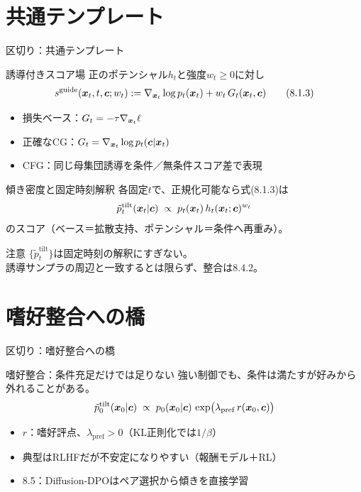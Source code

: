 \section{共通テンプレート}
\asmain
\begin{frame}{区切り：共通テンプレート}
    \tableofcontents[currentsection]
\end{frame}
\asmain
\begin{frame}{誘導付きスコア場}
    正のポテンシャル$h_t$と強度$w_t\ge 0$に対し
    \[
        s^{\mathrm{guide}}(\bm{x}_t,t,\bm{c};w_t)
        :=
        \nabla_{\bm{x}_t}\log p_t(\bm{x}_t)
        +
        w_t\,G_t(\bm{x}_t,\bm{c})
        \tag{8.1.3}
    \]
    \begin{itemize}
        \item 損失ベース：$G_t=-\tau\nabla_{\bm{x}_t}\ell$
        \item 正確なCG：$G_t=\nabla_{\bm{x}_t}\log p_t(\bm{c}|\bm{x}_t)$
        \item CFG：同じ母集団誘導を条件／無条件スコア差で表現
    \end{itemize}
\end{frame}
\asmain
\begin{frame}{傾き密度と固定時刻解釈}
    各固定$t$で、正規化可能なら式(8.1.3)は
    \[
        \tilde{p}^{\mathrm{tilt}}_{t}(\bm{x}_t|\bm{c})
        \;\propto\;
        p_t(\bm{x}_t)\,h_t(\bm{x}_t;\bm{c})^{w_t}
    \]
    のスコア（ベース＝拡散支持、ポテンシャル＝条件へ再重み）。
    \begin{alertblock}{注意}
        $\{\tilde{p}^{\mathrm{tilt}}_{t}\}$は固定時刻の解釈にすぎない。\\
        誘導サンプラの周辺と一致するとは限らず、整合は8.4.2。
    \end{alertblock}
\end{frame}
\section{嗜好整合への橋}
\asmain
\begin{frame}{区切り：嗜好整合への橋}
    \tableofcontents[currentsection]
\end{frame}
\asmain
\begin{frame}{嗜好整合：条件充足だけでは足りない}
    強い制御でも、条件は満たすが好みから外れることがある。
    \[
        \tilde{p}^{\mathrm{tilt}}_{0}(\bm{x}_0|\bm{c})
        \;\propto\;
        p_0(\bm{x}_0|\bm{c})\,
        \exp\bigl(\lambda_{\mathrm{pref}}\,r(\bm{x}_0,\bm{c})\bigr)
    \]
    \begin{itemize}
        \item $r$：嗜好評点、$\lambda_{\mathrm{pref}}>0$（KL正則化では$1/\beta$）
        \item 典型はRLHFだが不安定になりやすい（報酬モデル＋RL）
        \item 8.5：Diffusion-DPOはペア選択から傾きを直接学習
    \end{itemize}
\end{frame}
